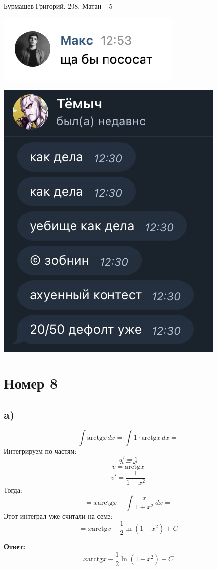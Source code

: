 \documentclass[a4paper,12pt]{article}
\author{Бурмашев Григорий, БПМИ-208}
\title{}
\date{\today}
\begin{document}
 
{\Large \begin{center}
Бурмашев Григорий. 208.  Матан -- 5
\end{center}}
\begin{center}
\includegraphics[scale=0.5]{1.jpg}
\end{center}
\begin{center}
\includegraphics[scale=0.5]{3.jpg}
\end{center}
\clearpage
\section*{Номер 8}
\subsection*{a)}
\[
\int \text{arctg} x \, dx = \int 1 \cdot \text{arctg} x \, dx = 
\]
Интегрируем по частям:
\[
u' = 1
\]
\[
u = x
\]
\[
v = \text{arctg} x
\]
\[
v' = \frac{1}{1+x^2}
\]
Тогда:
\[
 = x \text{arctg} x - \int \frac{x}{1+x^2}\,dx = 
\]
Этот интеграл уже считали на семе:
\[
= x \text{arctg} x  - \frac{1}{2} \ln (1+x^2) + C\]
{\Large \begin{center}
\textbf{Ответ: } 
\[
x \text{arctg} x  - \frac{1}{2} \ln (1+x^2) + C
\]
\end{center}}
\clearpage
\end{document}
